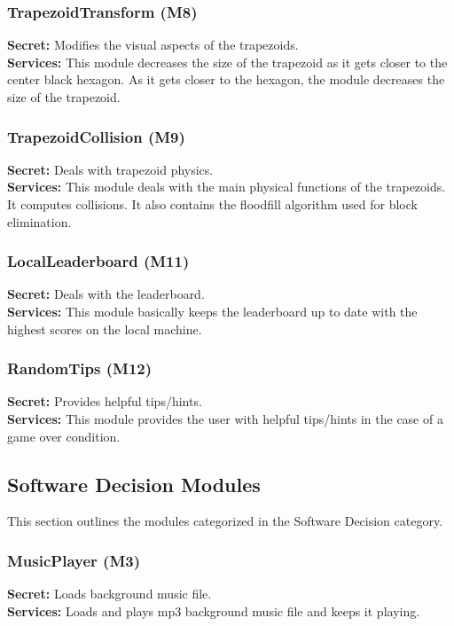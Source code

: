 \documentclass[12pt, titlepage]{article}
\begin{document}
{\color{blue}

\subsubsection{TrapezoidTransform (M8)}
\noindent \textbf{Secret:} Modifies the visual aspects of the trapezoids. \\
\textbf{Services:} This module decreases the size of the trapezoid as it gets closer to the center black hexagon. As it gets closer to the hexagon, the module decreases the size of the trapezoid.

\subsubsection{TrapezoidCollision (M9)}
\noindent \textbf{Secret:} Deals with trapezoid physics. \\
\textbf{Services:} This module deals with the main physical functions of the trapezoids. It computes collisions. It also contains the floodfill algorithm used for block elimination.

\subsubsection{LocalLeaderboard (M11)}
\noindent \textbf{Secret:}  Deals with the leaderboard.\\
\textbf{Services:} This module basically keeps the leaderboard up to date with the highest scores on the local machine.

\subsubsection{RandomTips (M12)}
\noindent \textbf{Secret:}  Provides helpful tips/hints.\\
\textbf{Services:} This module provides the user with helpful tips/hints in the case of a game over condition.

}


\subsection{Software Decision Modules}
\noindent This section outlines the modules categorized in the Software Decision category.
\subsubsection{MusicPlayer (M3)}
\noindent \textbf{Secret:} Loads background music file.\\
\textbf{Services:} Loads and plays mp3 background music file and keeps it playing. 
\end{document}
